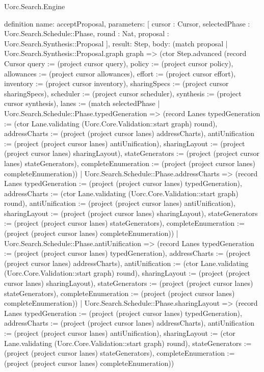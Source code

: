 \begin{lexlean}{Uorc.Search.Engine}
\begin{semanticmodule}
definition{
  name: acceptProposal,
  parameters: [
    cursor : Cursor,
    selectedPhase : Uorc.Search.Schedule::Phase,
    round : Nat,
    proposal : Uorc.Search.Synthesis::Proposal
  ],
  result: Step,
  body: (match proposal
    | Uorc.Search.Synthesis::Proposal.graph graph => (ctor Step.advanced (record Cursor {query := (project cursor query), policy := (project cursor policy), allowances := (project cursor allowances), effort := (project cursor effort), inventory := (project cursor inventory), sharingSpecs := (project cursor sharingSpecs), scheduler := (project cursor scheduler), synthesis := (project cursor synthesis), lanes := (match selectedPhase
      | Uorc.Search.Schedule::Phase.typedGeneration => (record Lanes {typedGeneration := (ctor Lane.validating (Uorc.Core.Validation::start graph) round), addressCharts := (project (project cursor lanes) addressCharts), antiUnification := (project (project cursor lanes) antiUnification), sharingLayout := (project (project cursor lanes) sharingLayout), stateGenerators := (project (project cursor lanes) stateGenerators), completeEnumeration := (project (project cursor lanes) completeEnumeration)})
      | Uorc.Search.Schedule::Phase.addressCharts => (record Lanes {typedGeneration := (project (project cursor lanes) typedGeneration), addressCharts := (ctor Lane.validating (Uorc.Core.Validation::start graph) round), antiUnification := (project (project cursor lanes) antiUnification), sharingLayout := (project (project cursor lanes) sharingLayout), stateGenerators := (project (project cursor lanes) stateGenerators), completeEnumeration := (project (project cursor lanes) completeEnumeration)})
      | Uorc.Search.Schedule::Phase.antiUnification => (record Lanes {typedGeneration := (project (project cursor lanes) typedGeneration), addressCharts := (project (project cursor lanes) addressCharts), antiUnification := (ctor Lane.validating (Uorc.Core.Validation::start graph) round), sharingLayout := (project (project cursor lanes) sharingLayout), stateGenerators := (project (project cursor lanes) stateGenerators), completeEnumeration := (project (project cursor lanes) completeEnumeration)})
      | Uorc.Search.Schedule::Phase.sharingLayout => (record Lanes {typedGeneration := (project (project cursor lanes) typedGeneration), addressCharts := (project (project cursor lanes) addressCharts), antiUnification := (project (project cursor lanes) antiUnification), sharingLayout := (ctor Lane.validating (Uorc.Core.Validation::start graph) round), stateGenerators := (project (project cursor lanes) stateGenerators), completeEnumeration := (project (project cursor lanes) completeEnumeration)})
}}
\end{semanticmodule}
\end{lexlean}
